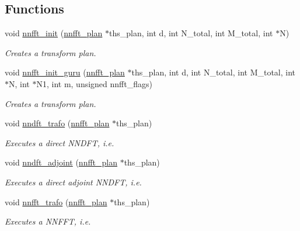 \subsection*{Functions}
\begin{CompactItemize}
\item 
void \hyperlink{group__nnfft_g03fa16df51ea6c10e65baf058f109c52}{nnfft\_\-init} (\hyperlink{structnnfft__plan}{nnfft\_\-plan} $\ast$ths\_\-plan, int d, int N\_\-total, int M\_\-total, int $\ast$N)
\begin{CompactList}\small\item\em Creates a transform plan. \item\end{CompactList}\item 
void \hyperlink{group__nnfft_g75a2cb786f4cc4c87082c87a2c32046a}{nnfft\_\-init\_\-guru} (\hyperlink{structnnfft__plan}{nnfft\_\-plan} $\ast$ths\_\-plan, int d, int N\_\-total, int M\_\-total, int $\ast$N, int $\ast$N1, int m, unsigned nnfft\_\-flags)
\begin{CompactList}\small\item\em Creates a transform plan. \item\end{CompactList}\item 
void \hyperlink{group__nnfft_g9c7b1467a923e54c20f231738e0078b8}{nndft\_\-trafo} (\hyperlink{structnnfft__plan}{nnfft\_\-plan} $\ast$ths\_\-plan)
\begin{CompactList}\small\item\em Executes a direct NNDFT, i.e. \item\end{CompactList}\item 
void \hyperlink{group__nnfft_g6c1a04c527de4a3399c776a85bc6533f}{nndft\_\-adjoint} (\hyperlink{structnnfft__plan}{nnfft\_\-plan} $\ast$ths\_\-plan)
\begin{CompactList}\small\item\em Executes a direct adjoint NNDFT, i.e. \item\end{CompactList}\item 
void \hyperlink{group__nnfft_g994c1748ebe1371c53dd2cb437054d4f}{nnfft\_\-trafo} (\hyperlink{structnnfft__plan}{nnfft\_\-plan} $\ast$ths\_\-plan)
\begin{CompactList}\small\item\em Executes a NNFFT, i.e. \item\end{CompactList}\item 

\end{CompactItemize}
